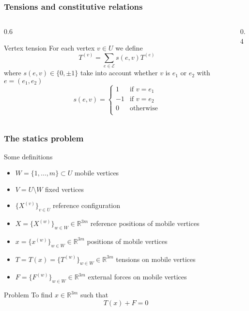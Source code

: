 \documentclass[10pt]{beamer}
\theoremstyle{definition}
\begin{document}
\begin{frame}
\frametitle{Tensions and constitutive relations}

\begin{columns}
\begin{column}{0.6\framewidth}
\begin{block}{Vertex tension}
For each vertex $v\in U$ we define
\[
T^{(v)}=\sum_{e\in\mathcal{E}}s(e,v)T^{(e)}
\]
where $s(e,v)\in\{0,\pm1\}$ take into account whether $v$ is $e_1$ or $e_2$ with $e=(e_1,e_2)$
\[
s(e,v)=
\begin{cases}
1 & \text{if $v=e_1$} \\
-1 & \text{if $v=e_2$} \\
0 & \text{otherwise} \\
\end{cases}
\]
\end{block}
\end{column}
\begin{column}{0.4\framewidth}
\begin{center}
\end{center}
\end{column}
\end{columns}

\end{frame}

\begin{frame}

\frametitle{The statics problem}

\begin{block}{Some definitions}
\begin{itemize}
\item $W=\{1,\dots,m\}\subset U$ mobile vertices
\item $V=U\setminus W$ fixed vertices
\item $\{X^{(v)}\}_{v\in U}$ reference configuration
\item $X=\{X^{(w)}\}_{w\in W}\in\mathbb{R}^{3m}$ reference positions of mobile vertices
\item $x=\{x^{(w)}\}_{w\in W}\in\mathbb{R}^{3m}$ positions of mobile vertices
\item $T=T(x)=\{T^{(w)}\}_{w\in W}\in\mathbb{R}^{3m}$ tensions on mobile vertices
\item $F=\{F^{(w)}\}_{w\in W}\in\mathbb{R}^{3m}$ external forces on mobile vertices
\end{itemize}
\end{block}

\begin{block}{Problem}
To find $x\in\mathbb{R}^{3m}$ such that
\[
T(x)+F=0
\]
\end{block}

\end{frame}
\end{document}
